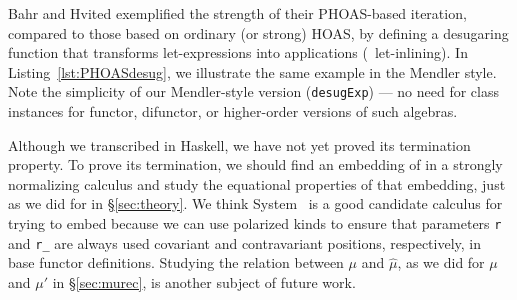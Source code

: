 Bahr and Hvited \cite{BahHvi12} exemplified the strength of their PHOAS-based
iteration, compared to those \cite{FegShe96,bgb,AhnShe11} based on ordinary
(or strong) HOAS, by defining a desugaring function that transforms
let-expressions into applications (\aka\ let-inlining).
In Listing~\ref{lst:PHOASdesug}, we illustrate the same example
in the Mendler style. Note the simplicity of our Mendler-style version
(\lstinline{desugExp}) --- no need for class instances for functor,
difunctor, or higher-order versions of such algebras.

Although we transcribed \mphit{} in Haskell, we have not yet proved
its termination property. To prove its termination, we should find
an embedding of \mphit{} in a strongly normalizing calculus and study
the equational properties of that embedding, just as we did for \msfit{}
in \S\ref{sec:theory}. We think System \Fixw\ is a good candidate calculus
for trying to embed \mphit{} because we can use polarized kinds to ensure
that parameters \lstinline{r} and \lstinline{r_} are always used covariant
and contravariant positions, respectively, in base functor definitions.
Studying the relation between $\mu$ and $\hat\mu$, as we did for
$\mu$ and $\mu'$ in \S\ref{sec:murec}, is another subject of future work.

